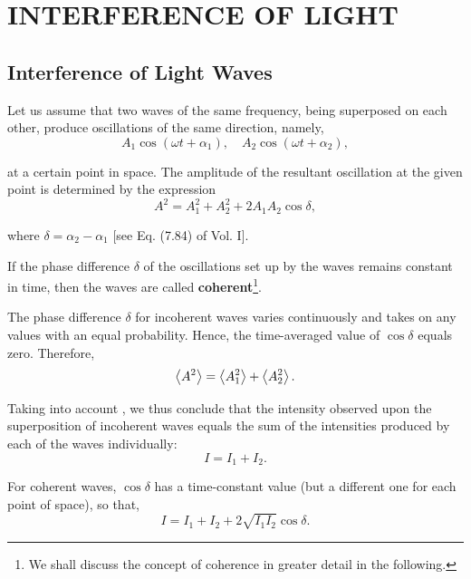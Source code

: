 

\chapter[INTERFERENCE OF LIGHT]{INTERFERENCE OF LIGHT}\label{chap:17}

\section{Interference of Light Waves}\label{sec:17_1}

Let us assume that two waves of the same frequency, being superposed on each other, produce oscillations of the same direction, namely,
\begin{equation*}
    A_1 \cos(\omega t + \alpha_1),\quad A_2 \cos(\omega t + \alpha_2),
\end{equation*}

\noindent
at a certain point in space.
The amplitude of the resultant oscillation at the given point is determined by the expression
\begin{equation*}
    A^2 = A_1^2 + A_2^2 + 2 A_1 A_2 \cos\delta,
\end{equation*}

\noindent
where $\delta=\alpha_2-\alpha_1$ [see Eq. (7.84) of Vol. I].

If the phase difference $\delta$ of the oscillations set up by the waves remains constant in time, then the waves are called \textbf{coherent}\footnote{We shall discuss the concept of coherence in greater detail in the following.}.

The phase difference $\delta$ for incoherent waves varies continuously and takes on any values with an equal probability.
Hence, the time-averaged value of $\cos\delta$ equals zero.
Therefore,
\begin{equation*}
    \left\langle A^2 \right\rangle = \left\langle A_1^2 \right\rangle + \left\langle A_2^2 \right\rangle.
\end{equation*}

\noindent
Taking into account , we thus conclude that the intensity observed upon the superposition of incoherent waves equals the sum of the intensities produced by each of the waves individually:
\begin{equation}\label{eq:17_1}
    I = I_1 + I_2.
\end{equation}

For coherent waves, $\cos\delta$ has a time-constant value (but a different one for each point of space), so that,
\begin{equation}\label{eq:17_2}
    I = I_1 + I_2 + 2 \sqrt{I_1 I_2} \cos \delta.
\end{equation}

